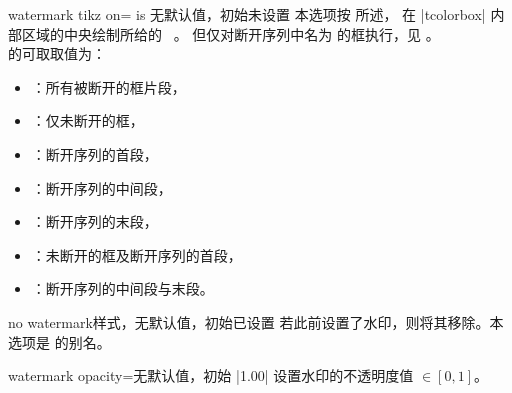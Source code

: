 \begin{docTcbKey}{watermark tikz on}{= is }{无默认值，初始未设置}
  本选项按  所述，
  在 |tcolorbox| 内部区域的中央绘制所给的 \tikzname\ 。
  但仅对断开序列中名为  的框执行，见 。\\
   的可取取值为：
  \begin{itemize}
  \item{}：所有被断开的框片段，
  \item{}：仅未断开的框，
  \item{}：断开序列的首段，
  \item{}：断开序列的中间段，
  \item{}：断开序列的末段，
  \item{}：未断开的框及断开序列的首段，
  \item{}：断开序列的中间段与末段。
  \end{itemize}
\end{docTcbKey}


\begin{docTcbKey}{no watermark}{}{样式，无默认值，初始已设置}
  若此前设置了水印，则将其移除。本选项是
   的别名。
\end{docTcbKey}


\clearpage
\begin{docTcbKey}{watermark opacity}{=}{无默认值，初始 |1.00|}
  设置水印的不透明度值 $\in[0,1]$。
\begin{dispExample}

\begin{tcolorbox}[title=Opacity 1.00,watermark opacity=1.00]
\lipsum[2]
\end{tcolorbox}\hfill%
\begin{tcolorbox}[title=Opacity 0.50,watermark opacity=0.50]
\lipsum[2]
\end{tcolorbox}%
\end{dispExample}
\end{docTcbKey}

\enlargethispage*{1cm}

